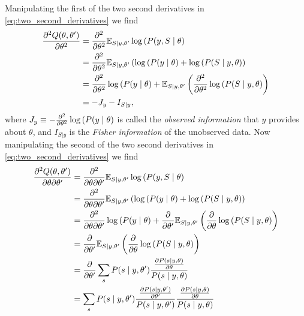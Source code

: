 Manipulating the first of the two second derivatives in
\eqref{eq:two_second_derivatives} we find
\begin{align}
  \frac{\partial^2 Q(\theta,  \theta')}{\partial \theta^2}
  &= \frac{\partial^2}{\partial \theta^2} \mathbb{E}_{S \mid y, \theta'}
    \log \left( P(y, S \mid \theta \right) \\
  &= \frac{\partial^2}{\partial \theta^2} \mathbb{E}_{S \mid y, \theta'}
    \left( \log \left( P(y \mid \theta \right) + \log \left( P(S
    \mid y, \theta \right) \right)\\
  &=  \frac{\partial^2}{\partial \theta^2} \log \left( P(y \mid
    \theta \right) + \mathbb{E}_{S \mid y, \theta'} \left(
    \frac{\partial^2}{\partial \theta^2} \log \left( P(S \mid y,
    \theta \right) \right) \\
  \label{eq:second_partial_information}
  &= -J_y - I_{S|y},
\end{align}
where
$J_y\equiv-\frac{\partial^2}{\partial \theta^2} \log \left( P(y \mid
  \theta \right)$ is called the \emph{observed information}
that $y$ provides about $\theta$, and $I_{S|y}$ is the \emph{Fisher
  information} of the unobserved data.  Now manipulating the second of
the two second derivatives in \eqref{eq:two_second_derivatives} we
find
\begin{align}
  \frac{\partial^2 Q(\theta,  \theta')}{\partial \theta \partial
  \theta'}
  &= \frac{\partial^2}{\partial \theta \partial \theta'} \EV_{S \given y, \theta'}
    \log \left( P(y, S \given \theta \right) \\
  &= \frac{\partial^2}{\partial \theta \partial \theta'} \EV_{S \given y, \theta'}
    \left( \log \left( P(y \given \theta \right) + \log \left( P(S
    \given y, \theta \right) \right)\\
  &=  \frac{\partial^2}{\partial \theta \partial \theta'} \log \left( P(y \given
    \theta \right) + \frac{\partial}{\partial \theta'} \EV_{S \given y, \theta'} \left(
    \frac{\partial}{\partial \theta} \log \left( P(S \given y,
    \theta \right) \right) \\
  &=  \frac{\partial}{\partial \theta'} \EV_{S \given y, \theta'} \left(
    \frac{\partial}{\partial \theta} \log \left( P(S \given y,
    \theta \right) \right) \\
  &= \frac{\partial}{\partial \theta'} \sum_s P(s \given y, \theta') %
    \frac{ %
    \frac{\partial P(s \given y,\theta )}{\partial \theta}
    }{P(s \given y,\theta )}  \\
  &= \sum_s P(s \given y, \theta') %
    \frac{ %
    \frac{\partial P(s \given y,\theta' )}{\partial \theta'}
    }{P(s \given y,\theta' )}
    \frac{ %
    \frac{\partial P(s \given y,\theta )}{\partial \theta}
    }{P(s \given y,\theta )}
\end{align}
